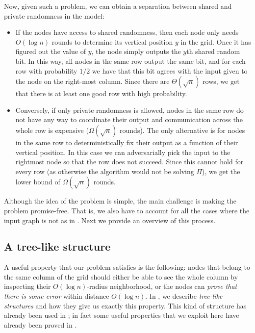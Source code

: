 \documentclass[11pt]{article}
\begin{document}
Now, given such a problem, we can obtain a separation between shared and private
randomness in the \local model: 
\begin{itemize}
	\item If the nodes have access to shared randomness, then each node only needs
	$O(\log n)$ rounds to determine its vertical position $y$ in the grid.
	Once it has figured out the value of $y$, the node simply outputs the $y$th
	shared random bit.
	In this way, all nodes in the same row output the same bit, and for each row
	with probability $1/2$ we have that this bit agrees with the input given to
	the node on the right-most column. 
	Since there are $\Theta(\sqrt{n})$ rows, we get that there is at least one
	good row with high probability.
	\item Conversely, if only private randomness is allowed, nodes in the same row
	do not have any way to coordinate their output and communication across the
	whole row is expensive ($\Omega(\sqrt{n})$ rounds).
	The only alternative is for nodes in the same row to deterministically fix
	their output as a function of their vertical position.
	In this case we can adversarially pick the input to the rightmost node so that
	the row does not succeed.
	Since this cannot hold for every row (as otherwise the algorithm would not be
	solving $\Pi$), we get the lower bound of $\Omega(\sqrt{n})$ rounds.
\end{itemize}

Although the idea of the problem is simple, the main challenge is making the
problem promise-free. 
That is, we also have to account for all the cases where the input graph is not
as in .
Next we provide an overview of this process.

\subsection{A tree-like structure}\label{ssec:roadmap:treelike}
A useful property that our problem satisfies is the following: nodes
that belong to the same column of the grid should either be able to see the whole
column by inspecting their $O(\log n)$-radius neighborhood, or the nodes can
\emph{prove that there is some error} within distance $O(\log n)$. In
, we describe \emph{tree-like structures} and how they give
us exactly this property. This kind of structure has already been used in
\cite{congest-lcls}; in fact some useful properties that we exploit here have
already been proved in \cite{congest-lcls}. 
\end{document}
